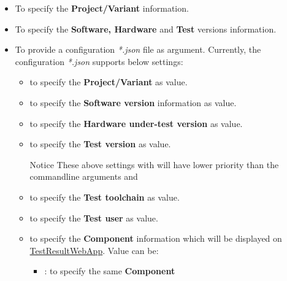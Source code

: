       \begin{itemize}
        \item {}
          To specify the \textbf{Project/Variant} information.

        \item {}
          To specify the \textbf{Software, Hardware} and \textbf{Test} versions
          information.

        \item {}
          To provide a configuration \emph{*.json} file as  argument.
          Currently, the configuration \emph{*.json} supports below settings:

          \begin{itemize}
            \item {} to specify the \textbf{Project/Variant} as
                   value.
            \item {} to specify the \textbf{Software version}
                  information as  value.
            \item {} to specify the
                  \textbf{Hardware under-test version} as  value.
            \item {} to specify the \textbf{Test version} as
                   value.
            \begin{boxhint} {Notice}
              These above settings with  will have lower
              priority than the commandline arguments 
              and 
            \end{boxhint}
            \item {} to specify the \textbf{Test toolchain} as
                   value.
            \item {} to specify the \textbf{Test user} as
                   value.
            \item {} to specify the \textbf{Component}
                  information which will be displayed on
                  \href{https://github.com/test-fullautomation/testresultwebapp}
                  {TestResultWebApp}. Value can be:
              \begin{itemize}
                \item {}: to specify the same \textbf{Component}

\end{itemize}
\end{itemize}
\end{itemize}
